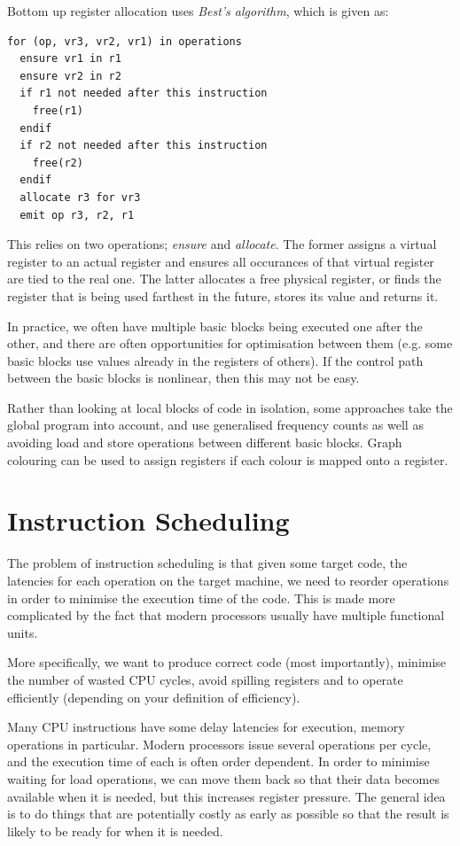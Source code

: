 Bottom up register allocation uses \textit{Best's algorithm}, which is
given as:

\begin{verbatim}
for (op, vr3, vr2, vr1) in operations
  ensure vr1 in r1
  ensure vr2 in r2
  if r1 not needed after this instruction
    free(r1)
  endif
  if r2 not needed after this instruction
    free(r2)
  endif
  allocate r3 for vr3
  emit op r3, r2, r1
\end{verbatim}

This relies on two operations; \textit{ensure}
and \textit{allocate}. The former assigns a virtual register to an
actual register and ensures all occurances of that virtual register
are tied to the real one. The latter allocates a free physical
register, or finds the register that is being used farthest in the
future, stores its value and returns it.

In practice, we often have multiple basic blocks being executed one
after the other, and there are often opportunities for optimisation
between them (e.g. some basic blocks use values already in the
registers of others). If the control path between the basic blocks is
nonlinear, then this may not be easy.

Rather than looking at local blocks of code in isolation, some
approaches take the global program into account, and use generalised
frequency counts as well as avoiding load and store operations between
different basic blocks. Graph colouring can be used to assign
registers if each colour is mapped onto a register.



\section{Instruction Scheduling}

The problem of instruction scheduling is that given some target code,
the latencies for each operation on the target machine, we need to
reorder operations in order to minimise the execution time of the
code. This is made more complicated by the fact that modern processors
usually have multiple functional units.

More specifically, we want to produce correct code (most importantly),
minimise the number of wasted CPU cycles, avoid spilling registers and
to operate efficiently (depending on your definition of efficiency).

Many CPU instructions have some delay latencies for execution, memory
operations in particular. Modern processors issue several operations
per cycle, and the execution time of each is often order dependent. In
order to minimise waiting for load operations, we can move them back
so that their data becomes available when it is needed, but this
increases register pressure. The general idea is to do things that are
potentially costly as early as possible so that the result is likely
to be ready for when it is needed.

